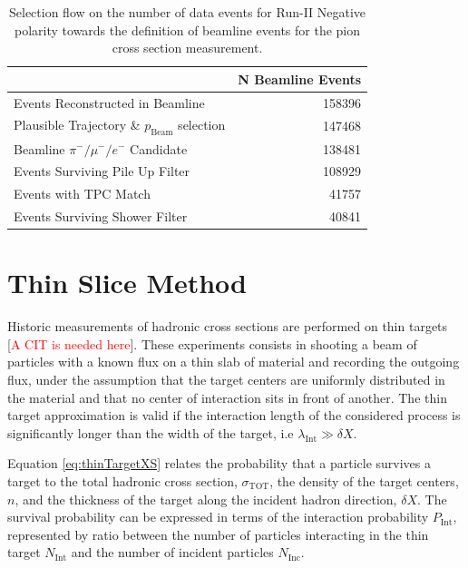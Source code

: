 \documentclass[aps,prl,twocolumn,showpacs,superscriptaddress,groupedaddress]{revtex4}  %
\begin{document}
\begin{table}
\caption{\label{tab:beamlineDataSelection}Selection flow on the number of data events for Run-II Negative polarity towards the definition of beamline events for the pion cross section measurement.}
\begin{ruledtabular}
\begin{tabular}{l|r}
                                                        &  N Beamline Events     \\ \hline
Events Reconstructed in Beamline        &  158396     \\ \hline
Plausible Trajectory \& $p_{\text{Beam}}$ selection       &   147468    \\ \hline
Beamline $\pi^-/\mu^-/e^-$  Candidate  &   138481    \\ \hline
Events Surviving Pile Up Filter              &   108929    \\ \hline
Events with TPC Match                         &    41757     \\ \hline
Events Surviving Shower Filter             &    40841     \\ 
\end{tabular}
\end{ruledtabular}
\end{table}



\section{\label{sec:ThinSliceMethod}Thin Slice Method}
Historic measurements of hadronic cross sections are performed on thin targets [\textcolor{red}{A CIT is needed here}]. These experiments consists in shooting a beam of particles with a known flux on a thin slab of material and recording the outgoing flux, under the assumption that the target centers are uniformly distributed in the material and that no center of interaction sits in front of another. The thin target approximation is valid if the interaction length of the considered process is significantly longer than the width of the target, i.e $\lambda_{\text{Int}} \gg \delta X$.

Equation \ref{eq:thinTargetXS} relates the probability that a particle survives a target to the total hadronic cross section, $\sigma_{\text{TOT}}$, the density of the target centers, $n$,  and  the thickness of the target  along the incident hadron direction, $\delta X$. The survival probability can be expressed in terms of the interaction probability $P_{\text{Int}}$, represented by ratio between the number of particles interacting in the thin target $N_{\text{Int}}$ and the number of incident particles $N_{\text{Inc}}$.
\end{document}
